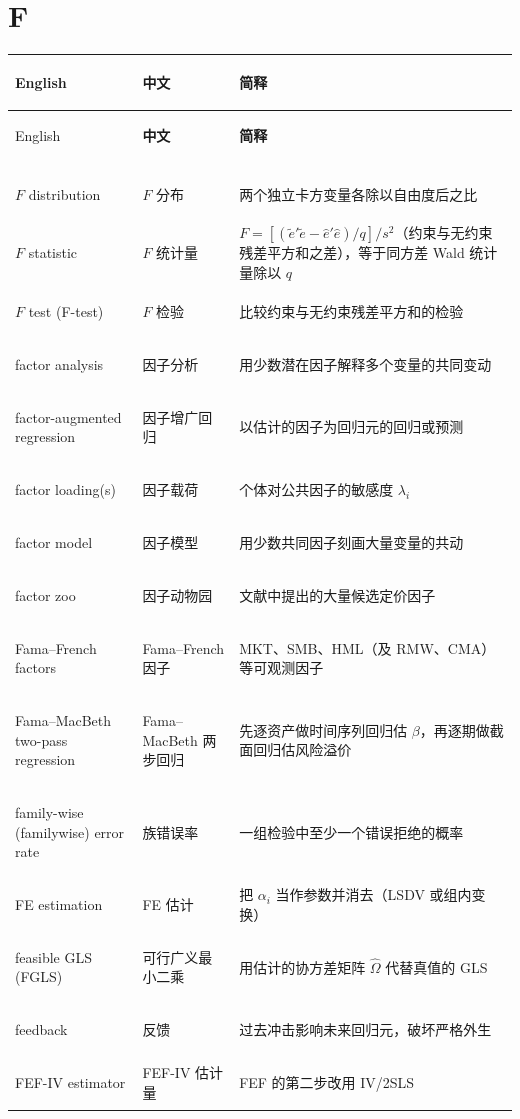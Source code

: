 \section*{F}
\begin{longtable}{@{}>{\bfseries\boldmath\raggedright\arraybackslash}p{4.6cm}>{\raggedright\arraybackslash}p{3.2cm}>{\raggedright\arraybackslash}p{\dimexpr\textwidth-7.8cm-4\tabcolsep\relax}@{}}
\toprule
English & \textbf{中文} & \textbf{简释}\\
\midrule
\endfirsthead
\toprule
English & \textbf{中文} & \textbf{简释}\\
\midrule
\endhead
\midrule
\multicolumn{3}{r@{}}{\footnotesize\itshape （续下页）}\\
\endfoot
\bottomrule
\endlastfoot
$F$ distribution & $F$ 分布 & 两个独立卡方变量各除以自由度后之比 \\
$F$ statistic & $F$ 统计量 & $F=[(\tilde e'\tilde e-\hat e'\hat e)/q]/s^2$（约束与无约束残差平方和之差），等于同方差 Wald 统计量除以 $q$ \\
$F$ test (F-test) & $F$ 检验 & 比较约束与无约束残差平方和的检验 \\
factor analysis & 因子分析 & 用少数潜在因子解释多个变量的共同变动 \\
factor-augmented regression & 因子增广回归 & 以估计的因子为回归元的回归或预测 \\
factor loading(s) & 因子载荷 & 个体对公共因子的敏感度 $\lambda_i$ \\
factor model & 因子模型 & 用少数共同因子刻画大量变量的共动 \\
factor zoo & 因子动物园 & 文献中提出的大量候选定价因子 \\
Fama--French factors & Fama--French 因子 & MKT、SMB、HML（及 RMW、CMA）等可观测因子 \\
Fama--MacBeth two-pass regression & Fama--MacBeth 两步回归 & 先逐资产做时间序列回归估 $\beta$，再逐期做截面回归估风险溢价 \\
family-wise (familywise) error rate & 族错误率 & 一组检验中至少一个错误拒绝的概率 \\
FE estimation & FE 估计 & 把 $\alpha_i$ 当作参数并消去（LSDV 或组内变换） \\
feasible GLS (FGLS) & 可行广义最小二乘 & 用估计的协方差矩阵 $\hat\Omega$ 代替真值的 GLS \\
feedback & 反馈 & 过去冲击影响未来回归元，破坏严格外生 \\
FEF-IV estimator & FEF-IV 估计量 & FEF 的第二步改用 IV/2SLS \\

\end{longtable}
